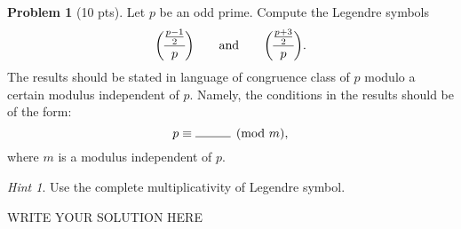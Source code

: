 \documentclass[11pt]{article}
\theoremstyle{plain}
\theoremstyle{definition}
\newtheorem{problem}{Problem}
\theoremstyle{remark}
\newtheorem*{hint}{Hint}
\numberwithin{equation}{problem}
\newcommand{\genlegendre}[4]{%
  \genfrac{(}{)}{}{#1}{#3}{#4}%
  \if\relax\detokenize{#2}\relax\else_{\!#2}\fi
}
\newcommand{\dlegendre}[3][]{\genlegendre{0}{#1}{#2}{#3}}
\begin{document}
\begin{problem}[10 pts]
	Let $p$ be an odd prime. Compute the Legendre symbols 
	\[
		\dlegendre{\frac{p-1}{2}}{p}\qquad\text{and}\qquad\dlegendre{\frac{p+3}{2}}{p}.
	\]
	The results should be stated in language of congruence class of $p$ modulo a certain modulus independent of $p$. Namely, the conditions in the results should be of the form:
	\[
		p\equiv \rule{1cm}{0.15mm} \pmod{m},
	\]
	where $m$ is a modulus independent of $p$. 
	\begin{hint}
		Use the complete multiplicativity of Legendre symbol. 
	\end{hint}
\end{problem}
\begin{solution} %
WRITE YOUR SOLUTION HERE
\end{solution}\clearpage %
\end{document}
